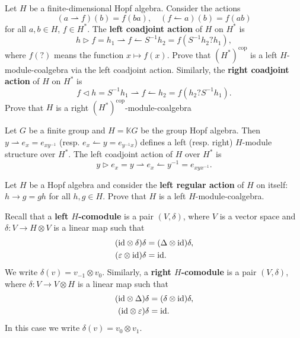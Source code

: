 \begin{exercise}
Let $H$ be a finite-dimensional Hopf algebra. Consider the actions
\[
(a\rightharpoonup f)(b)=f(ba),
\quad 
(f\leftharpoonup a)(b)=f(ab)
\]
for all $a,b\in H$, $f\in H^{*}$. The \textbf{left coadjoint action}
of $H$ on $H^{*}$ is 
\[
h\triangleright f=h_{1}\rightharpoonup f\leftharpoonup S^{-1}h_{2}=f(S^{-1}h_{2}?h_1),
\]
where $f(?)$ means the function $x\mapsto f(x)$. Prove that
$(H^*)^\mathrm{cop}$ is a left $H$-module-coalgebra via the left coadjoint
action. Similarly, the \textbf{right coadjoint action} of $H$ on $H^{*}$ is 
\[
f\triangleleft h=S^{-1}h_{1}\rightharpoonup f\leftharpoonup h_{2}=f(h_2?S^{-1}h_{1}).
\]
Prove that $H$ is a right $(H^*)^\mathrm{cop}$-module-coalgebra 
\end{exercise}

\begin{example}
Let $G$ be a finite group and $H=\mathbb{K}G$ be the group Hopf algebra. Then
$y\rightharpoonup e_{x}=e_{xy^{-1}}$ (resp. $e_{x}\leftharpoonup
y=e_{y^{-1}x}$) defines a left (resp. right) $H$-module structure over $H^{*}$.
The left coadjoint action of $H$ over $H^{*}$ is 
\[
y\triangleright e_{x}=y\rightharpoonup e_{x}\leftharpoonup y^{-1}=e_{xyx^{-1}}.
\]
\end{example}

\begin{exercise}
Let $H$ be a Hopf algebra and consider the \textbf{left regular action} of $H$ on itself:
$h\rightarrow g=gh$ for all
$h,g\in H$. Prove that $H$ is a left $H$-module-coalgebra. 
\end{exercise}


Recall that a \textbf{left $H$-comodule} is a pair $(V,\delta)$,
where $V$ is a vector space and $\delta:V\to H\otimes V$ is a linear
map such that 
\begin{align*}
(\mathrm{id}\otimes\delta)\delta & =(\Delta\otimes\mathrm{id})\delta,\\
(\varepsilon\otimes\mathrm{id})\delta & =\mathrm{id}.
\end{align*}
We write $\delta(v)=v_{-1}\otimes v_{0}$. Similarly, a \textbf{right
$H$-comodule} is a pair $(V,\delta)$, where $\delta:V\to V\otimes H$
is a linear map such that 
\begin{align*}
(\mathrm{id}\otimes\Delta)\delta & =(\delta\otimes\mathrm{id})\delta,\\
(\mathrm{id}\otimes\varepsilon)\delta & =\mathrm{id}.
\end{align*}
In this case we write $\delta(v)=v_{0}\otimes v_{1}$.

